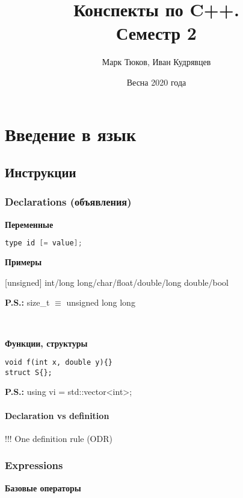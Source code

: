 \documentclass[12pt]{article}
\title{Конспекты по C++. \\\large Семестр 2}
\author{Марк Тюков, Иван Кудрявцев}
\date{Весна 2020 года}
\newcommand{\ps}{\textbf{P.S.: }}
\begin{document}
\maketitle
\tableofcontents
\newpage

\section{Введение в язык}
\subsection{Инструкции}

\subsubsection{Declarations (объявления)}

\textbf{Переменные}
\begin{lstlisting}[language=C++]
type id [= value];
\end{lstlisting}

\textbf{Примеры}

[unsigned] int/long long/char/float/double/long double/bool

\ps size\_t $\equiv$ unsigned long long

\

\textbf{Функции, структуры}

\begin{lstlisting}
void f(int x, double y){}
struct S{};
\end{lstlisting}

\ps using vi = std::vector<int>;

\paragraph{Declaration vs definition}

!!! One definition rule (ODR)

\subsubsection{Expressions}

\textbf{Базовые операторы} 
\end{document}
